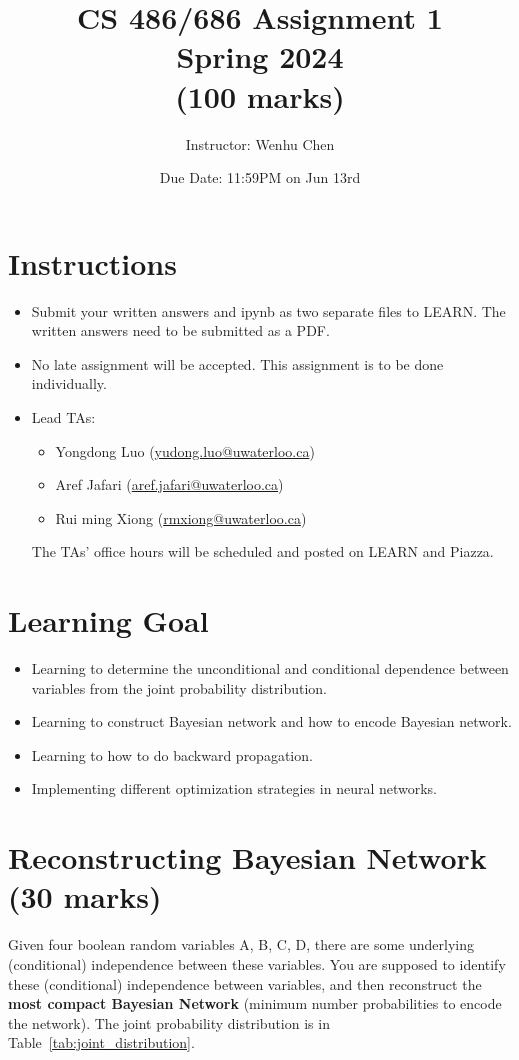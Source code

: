 \documentclass[12pt]{article}
\title{CS 486/686 Assignment 1 \\ Spring 2024 \\ (100 marks) }
\author{Instructor: Wenhu Chen}
\date{Due Date: 11:59PM on Jun 13rd}
\begin{document}
\maketitle

\section*{Instructions}

\begin{itemize}
	\item Submit your written answers and ipynb as two separate files to LEARN. The written answers need to be submitted as a PDF.

	\item
	      No late assignment will be accepted. This assignment is to be done individually.

	\item
	      Lead TAs:
	      \begin{itemize}
		      \item
		            Yongdong Luo (\url{yudong.luo@uwaterloo.ca})
		      \item
		            Aref Jafari (\url{aref.jafari@uwaterloo.ca})
		      \item
		            Rui ming Xiong (\url{rmxiong@uwaterloo.ca})
	      \end{itemize}
	      The TAs' office hours will be scheduled and posted on LEARN and Piazza.
\end{itemize}

\section*{Learning Goal}
\begin{itemize}
	\item Learning to determine the unconditional and conditional dependence between variables from the joint probability distribution.
	\item Learning to construct Bayesian network and how to encode Bayesian network.
	\item Learning to how to do backward propagation.
	\item Implementing different optimization strategies in neural networks.
\end{itemize}


\section{Reconstructing Bayesian Network (30 marks)}
Given four boolean random variables A, B, C, D, there are some underlying (conditional) independence between these variables. You are supposed to identify these (conditional) independence between variables, and then reconstruct the \textbf{most compact Bayesian Network} (minimum number probabilities to encode the network). The joint probability distribution is in Table~\ref{tab:joint_distribution}.
\end{document}
